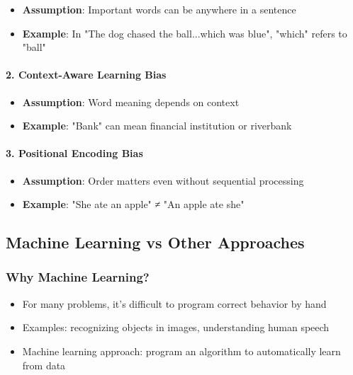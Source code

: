 \begin{itemize}
\item \textbf{Assumption}: Important words can be anywhere in a sentence
\item \textbf{Example}: In "The dog chased the ball...which was blue", "which" refers to "ball"
\end{itemize}

\paragraph{2. Context-Aware Learning Bias}

\begin{itemize}
\item \textbf{Assumption}: Word meaning depends on context
\item \textbf{Example}: "Bank" can mean financial institution or riverbank
\end{itemize}

\paragraph{3. Positional Encoding Bias}

\begin{itemize}
\item \textbf{Assumption}: Order matters even without sequential processing
\item \textbf{Example}: "She ate an apple" ≠ "An apple ate she"
\end{itemize}

\subsection{Machine Learning vs Other Approaches}

\subsubsection{Why Machine Learning?}

\begin{itemize}
\item For many problems, it's difficult to program correct behavior by hand
\item Examples: recognizing objects in images, understanding human speech
\item Machine learning approach: program an algorithm to automatically learn from data
\end{itemize}

